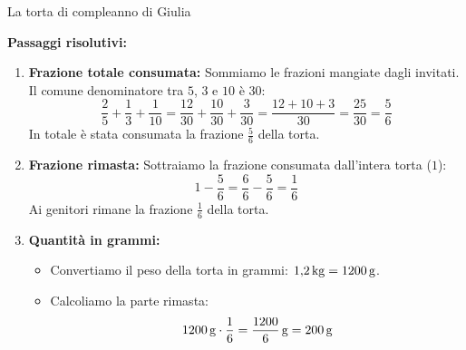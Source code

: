 \begin{esercizio}{La torta di compleanno di Giulia}
\begin{soluzione}
  \textbf{Passaggi risolutivi:}
  \begin{enumerate}[label=\alph*)]
    \item \textbf{Frazione totale consumata:} Sommiamo le frazioni mangiate dagli invitati. Il comune denominatore tra $5$, $3$ e $10$ è $30$:
      \[
      \frac{2}{5} + \frac{1}{3} + \frac{1}{10} = \frac{12}{30} + \frac{10}{30} + \frac{3}{30} = \frac{12+10+3}{30} = \frac{25}{30} = \frac{5}{6}
      \]
      In totale è stata consumata la frazione $\frac{5}{6}$ della torta.
    \item \textbf{Frazione rimasta:} Sottraiamo la frazione consumata dall'intera torta ($1$):
      \[
      1 - \frac{5}{6} = \frac{6}{6} - \frac{5}{6} = \frac{1}{6}
      \]
      Ai genitori rimane la frazione $\frac{1}{6}$ della torta.
    \item \textbf{Quantità in grammi:}
      \begin{itemize}
        \item Convertiamo il peso della torta in grammi: $1{,}2\,\mathrm{kg} = 1200\,\mathrm{g}$.
        \item Calcoliamo la parte rimasta:
          \[
          1200\,\mathrm{g} \cdot \frac{1}{6} = \frac{1200}{6}\,\mathrm{g} = 200\,\mathrm{g}
          \]
      \end{itemize}
  \end{enumerate}
\end{soluzione}
\end{esercizio}

\condnewpage



